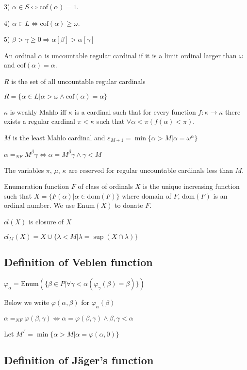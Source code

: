 \documentclass[10pt]{article}
\begin{document}
3) \(\alpha\in S\Leftrightarrow \text{cof}(\alpha)=1\). 

4) \(\alpha\in L\Leftrightarrow \text{cof}(\alpha)\geq\omega\).

5) \(\beta>\gamma\geq0 \Rightarrow \alpha[\beta]>\alpha[\gamma]\)

An ordinal \(\alpha\) is uncountable regular cardinal if it is a limit ordinal larger than \(\omega\) and \(\text{cof}(\alpha)=\alpha\).

\(R\) is the set of all uncountable regular cardinals 

\(R=\{\alpha\in L|\alpha>\omega\wedge\text{cof}(\alpha)=\alpha\}\)

\(\kappa\) is weakly Mahlo iff \(\kappa\) is a cardinal such that for every function \(f: \kappa\rightarrow\kappa\) there
exists a regular cardinal \(\pi < \kappa\) such that \(\forall\alpha<\pi(f(\alpha)< \pi)\).

\(M\) is  the least Mahlo cardinal and \(\varepsilon_{M+1}=\min\{\alpha>M|\alpha=\omega^\alpha\}\) 

\(\alpha=_{NF}M^\beta\gamma\Leftrightarrow\alpha=M^\beta\gamma\wedge\gamma<M\)

The variables \(\pi\), \(\mu\), \(\kappa\) are reserved for regular uncountable cardinals less than \(M\).

Enumeration function \(F\) of class of ordinals \(X\) is the unique increasing function such that \(X=\{F(\alpha)|\alpha\in\text{dom}(F)\}\) where domain of \(F\), \(\text{dom}(F)\) is an ordinal number. We use \(\text{Enum}(X)\) to donate \(F\).

\(cl(X) \) is closure of \(X\) 

\(cl_M(X)=X\cup\{\lambda<M|\lambda=\sup(X\cap\lambda)\} \)

\subsection{Definition of Veblen function}

\(\varphi_\alpha=\text{Enum}(\{\beta\in P|\forall\gamma<\alpha(\varphi_\gamma(\beta)=\beta)\})\)

Below we write \(\varphi(\alpha,\beta)\) for \(\varphi_\alpha(\beta)\)

\(\alpha=_{NF}\varphi(\beta,\gamma)\Leftrightarrow\alpha=\varphi(\beta,\gamma)\wedge\beta,\gamma<\alpha\)

Let \(M^{\Gamma}=\min\{\alpha>M|\alpha=\varphi(\alpha,0)\}\)

\subsection{Definition of Jäger's function}
\end{document}
